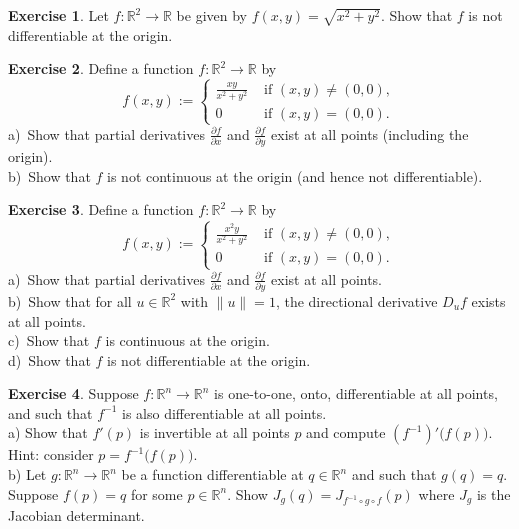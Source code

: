 \documentclass[12pt]{book}
\newcommand{\snorm}[1]{\lVert {#1} \rVert}
\newcommand{\R}{{\mathbb{R}}}
\theoremstyle{plain}
\theoremstyle{remark}
\theoremstyle{definition}
\theoremstyle{exercise}
\newtheorem{exercise}{Exercise}[section]
\theoremstyle{example}
\begin{document}
\begin{exercise}
Let $f \colon \R^2 \to \R$ be given by
$f(x,y)
=
\sqrt{x^2+y^2}$.
Show that $f$ is not differentiable at the origin.
\end{exercise}

\begin{exercise} \label{exercise:noncontpartialsexist}
Define a function $f \colon \R^2 \to \R$ by
\begin{equation*}
f(x,y)
:=
\begin{cases}
\frac{xy}{x^2+y^2} & \text{ if $(x,y) \not= (0,0)$}, \\
0 & \text{ if $(x,y) = (0,0)$}.
\end{cases}
\end{equation*}
a)~Show that partial derivatives 
$\frac{\partial f}{\partial x}$ and
$\frac{\partial f}{\partial y}$ exist at all points (including the origin).\\
b)~Show that $f$ is not continuous at the origin (and hence not
differentiable).
\end{exercise}

\begin{exercise}
Define a function $f \colon \R^2 \to \R$ by
\begin{equation*}
f(x,y)
:=
\begin{cases}
\frac{x^2y}{x^2+y^2} & \text{ if $(x,y) \not= (0,0)$}, \\
0 & \text{ if $(x,y) = (0,0)$}.
\end{cases}
\end{equation*}
a)~Show that partial derivatives 
$\frac{\partial f}{\partial x}$ and
$\frac{\partial f}{\partial y}$ exist at all points.\\
b)~Show that for all $u \in \R^2$ with $\snorm{u}=1$, the directional
derivative $D_u f$ exists at all points.\\
c)~Show that $f$ is continuous at the origin.\\
d)~Show that $f$ is not differentiable at the origin.
\end{exercise}

\begin{exercise}
Suppose $f \colon \R^n \to \R^n$ is one-to-one, onto, differentiable at all
points, and such that $f^{-1}$ is also differentiable at all points.\\
a) Show that $f'(p)$ is invertible at all points $p$ and compute
${(f^{-1})}'\bigl(f(p)\bigr)$.  Hint: consider $p = f^{-1}\bigl(f(p)\bigr)$.\\
b) Let $g \colon \R^n \to \R^n$ be a function differentiable at $q \in \R^n$
and such that $g(q)=q$.  Suppose $f(p) = q$ for some $p \in \R^n$.
Show $J_g(q) = J_{f^{-1} \circ g \circ f}(p)$ where $J_g$ is the Jacobian
determinant.
\end{exercise}
\end{document}
